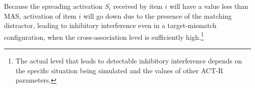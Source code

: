 \documentclass{cambridge7A}\usepackage[]{graphicx}\usepackage[]{color}
\begin{document}
\begin{enumerate}
\label{crossasspageref}
Because the  spreading activation $S_i$ received by item $i$ will have a value less than MAS, activation of item $i$ will go down due to the presence of the matching distractor, leading to inhibitory interference even in a target-mismatch configuration, when the cross-association level is sufficiently high.\footnote{The actual level that leads to detectable inhibitory interference depends on the specific situation being simulated and the values of other ACT-R parameters.}

\end{enumerate}







\end{document}
